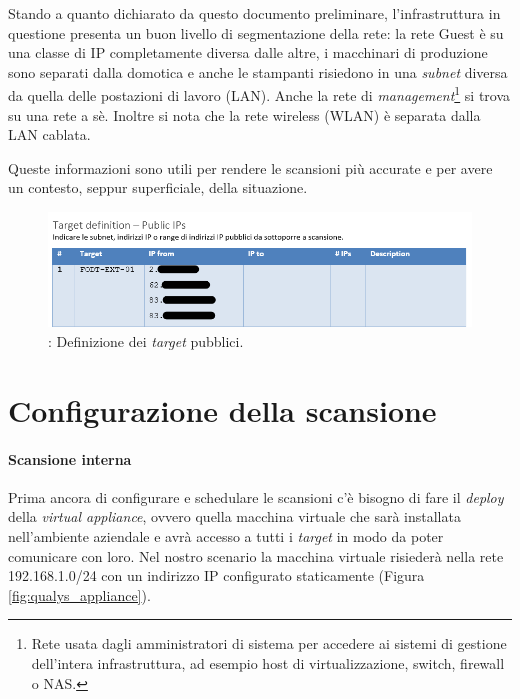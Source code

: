 \documentclass[target=bach,aauheader=]{thud}
\begin{document}
Stando a quanto dichiarato da questo documento preliminare, l'infrastruttura in questione presenta un buon livello di segmentazione della rete: la rete Guest è su una classe di IP completamente diversa dalle altre, i macchinari di produzione sono separati dalla domotica e anche le stampanti risiedono in una \textit{subnet} diversa da quella delle postazioni di lavoro (LAN). Anche la rete di \textit{management}\footnote{Rete usata dagli amministratori di sistema per accedere ai sistemi di gestione dell'intera infrastruttura, ad esempio host di virtualizzazione, switch, firewall o NAS.} si trova su una rete a sè. Inoltre si nota che la rete wireless (WLAN) è separata dalla LAN cablata.

Queste informazioni sono utili per rendere le scansioni più accurate e per avere un contesto, seppur superficiale, della situazione.

\begin{figure}[h]
\centering
\includegraphics[scale=0.8]{images/target_definition_ext.png}
    \caption{: Definizione dei \textit{target} pubblici.}
    \label{fig:target_definition_ext}
\end{figure}

\section{Configurazione della scansione}
\paragraph{Scansione interna} Prima ancora di configurare e schedulare le scansioni c'è bisogno di fare il \textit{deploy} della \textit{virtual appliance}, ovvero quella macchina virtuale che sarà installata nell'ambiente aziendale e avrà accesso a tutti i \textit{target} in modo da poter comunicare con loro. Nel nostro scenario la macchina virtuale risiederà nella rete 192.168.1.0/24 con un indirizzo IP configurato staticamente (Figura \ref{fig:qualys_appliance}).
\end{document}
